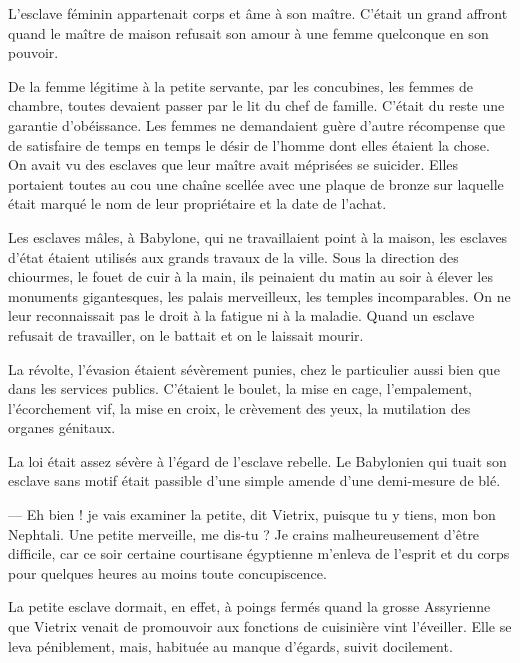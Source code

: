 \documentclass[a4paper, 11pt, oneside, polutonikogreek, french]{article}
\begin{document}
L'esclave féminin appartenait corps et âme à son maître. C'était un grand affront quand le maître de maison refusait son amour à une femme quelconque en son pouvoir.

De la femme légitime à la petite servante, par les concubines, les femmes de chambre, toutes devaient passer par le lit du chef de famille. C'était du reste une garantie d'obéissance. Les femmes ne demandaient guère d'autre récompense que de satisfaire de temps en temps le désir de l'homme dont elles étaient la chose. On avait vu des esclaves que leur maître avait méprisées se suicider. Elles portaient toutes au cou une chaîne scellée avec une plaque de bronze sur laquelle était marqué le nom de leur propriétaire et la date de l'achat.

\bigskip
\centerline{\EightStarTaper}
\centerline{\EightStarTaper\EightStarTaper}
\bigskip

Les esclaves mâles, à Babylone, qui ne travaillaient point à la maison, les esclaves d'état étaient utilisés aux grands travaux de la ville. Sous la direction des chiourmes, le fouet de cuir à la main, ils peinaient du matin au soir à élever les monuments gigantesques, les palais merveilleux, les temples incomparables. On ne leur reconnaissait pas le droit à la fatigue ni à la maladie. Quand un esclave refusait de travailler, on le battait et on le laissait mourir.

La révolte, l'évasion étaient sévèrement punies, chez le particulier aussi bien que dans les services publics. C'étaient le boulet, la mise en cage, l'empalement, l'écorchement vif, la mise en croix, le crèvement des yeux, la mutilation des organes génitaux.

La loi était assez sévère à l'égard de l'esclave rebelle. Le Babylonien qui tuait son esclave sans motif était passible d'une simple amende d'une demi-mesure de blé.

\bigskip
\centerline{\EightStarTaper}
\centerline{\EightStarTaper\EightStarTaper}
\bigskip

--- Eh bien ! je vais examiner la petite, dit Vietrix, puisque tu y tiens, mon bon Nephtali. Une petite merveille, me dis-tu ? Je crains malheureusement d'être difficile, car ce soir certaine courtisane égyptienne m'enleva de l'esprit et du corps pour quelques heures au moins toute concupiscence.

La petite esclave dormait, en effet, à poings fermés quand la grosse Assyrienne que Vietrix venait de promouvoir aux fonctions de cuisinière vint l'éveiller. Elle se leva péniblement, mais, habituée au manque d'égards, suivit docilement.
\end{document}
